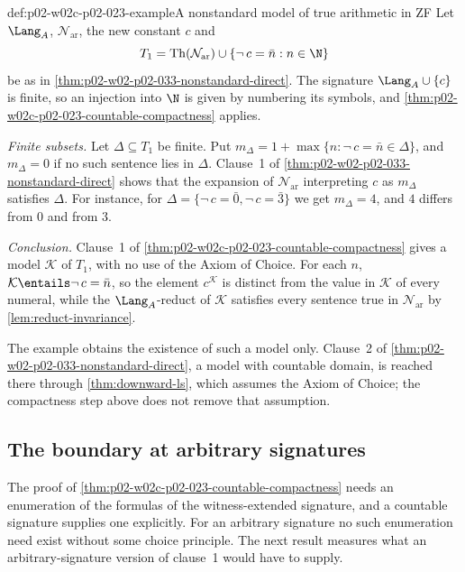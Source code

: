 \begin{hbexample}{def:p02-w02c-p02-023-example}{A nonstandard model of true arithmetic in ZF}
Let \(\Lang_A\), \(\mathcal N_{\mathrm{ar}}\), the new constant \(c\) and
\[
 T_1=\operatorname{Th}(\mathcal N_{\mathrm{ar}})\cup
 \{\neg\,c=\bar n:n\in\N\}
\]
be as in \cref{thm:p02-w02-p02-033-nonstandard-direct}.  The signature
\(\Lang_A\cup\{c\}\) is finite, so an injection into \(\N\) is given by
numbering its symbols, and \cref{thm:p02-w02c-p02-023-countable-compactness}
applies.

\emph{Finite subsets.}  Let \(\Delta\subseteq T_1\) be finite.  Put
\(m_\Delta=1+\max\{n:\neg\,c=\bar n\in\Delta\}\), and \(m_\Delta=0\) if no
such sentence lies in \(\Delta\).  Clause~1 of
\cref{thm:p02-w02-p02-033-nonstandard-direct} shows that the expansion of
\(\mathcal N_{\mathrm{ar}}\) interpreting \(c\) as \(m_\Delta\) satisfies
\(\Delta\).  For instance, for
\(\Delta=\{\neg\,c=\bar 0,\neg\,c=\bar 3\}\) we get \(m_\Delta=4\), and
\(4\) differs from \(0\) and from \(3\).

\emph{Conclusion.}  Clause~1 of
\cref{thm:p02-w02c-p02-023-countable-compactness} gives a model
\(\mathcal K\) of \(T_1\), with no use of the Axiom of Choice.  For each
\(n\), \(\mathcal K\entails\neg\,c=\bar n\), so the element
\(c^{\mathcal K}\) is distinct from the value in \(\mathcal K\) of every
numeral, while the \(\Lang_A\)-reduct of \(\mathcal K\) satisfies every
sentence true in \(\mathcal N_{\mathrm{ar}}\) by
\cref{lem:reduct-invariance}.

The example obtains the existence of such a model only.  Clause~2 of
\cref{thm:p02-w02-p02-033-nonstandard-direct}, a model with countable
domain, is reached there through \cref{thm:downward-ls}, which assumes the
Axiom of Choice; the compactness step above does not remove that
assumption.
\end{hbexample}

\subsection{The boundary at arbitrary signatures}
\label{sec:p02-w02c-p02-023-boundary}

The proof of \cref{thm:p02-w02c-p02-023-countable-compactness} needs an
enumeration of the formulas of the witness-extended signature, and a
countable signature supplies one explicitly.  For an arbitrary signature no
such enumeration need exist without some choice principle.  The next result
measures what an arbitrary-signature version of clause~1 would have to
supply.

